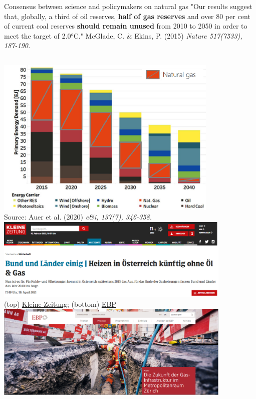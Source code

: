 \documentclass[aspectratio=169]{beamer}
\begin{document}
\begin{frame}[t]{Consensus between science and policymakers on natural gas}
\small"Our results suggest that, globally, a third of oil reserves, \textbf{half of gas reserves} and over 80 per cent of current coal reserves \textbf{should remain unused} from 2010 to 2050 in order to meet the target of 2.0°C." McGlade, C. \& Ekins, P. (2015) \emph{Nature 517(7533), 187-190.}
\vspace{0.25cm}
	\begin{columns}[T] 	
		\includegraphics[width=0.8\textwidth] {openENTRANCE}\\\vspace{0.1cm}\tiny \hspace{0.75cm}Source: Auer et al. (2020) \emph{e\&i, 137(7), 346-358.}
		\includegraphics[width=0.85\textwidth] {policymakers}\\
		\hspace{1.75cm}\tiny(top) \href{https://www.kleinezeitung.at/wirtschaft/5968089/Bund-und-Laender-einig_Heizen-in-Oesterreich-kuenftig-ohne-Oel-Gas}{Kleine Zeitung}; (bottom) \href{https://www.ebp.ch/de/projekte/die-zukunft-der-gas-infrastruktur-im-metropolitanraum-zuerich}{EBP}\\
		\vspace{0.1cm}
		\includegraphics[width=0.85\textwidth] {zuerich}
	\end{columns} 
\end{frame}
\end{document}
